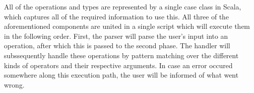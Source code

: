 \par
All of the operations and types are represented by a single case class in Scala,
which captures all of the required information to use this. All three of the
aforementioned components are united in a single script which will execute them
in the following order. First, the parser will parse the user's input into an
operation, after which this is passed to the second phase. The handler will
subssequently handle these operations by pattern matching over the different
kinds of operators and their respective arguments. In case an error occured
somewhere along this execution path, the user will be informed of what went wrong.



 

